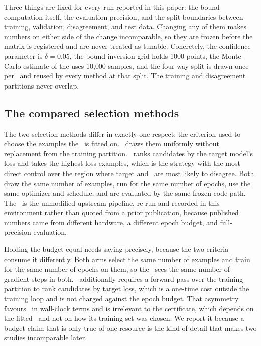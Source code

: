 Three things are fixed for every run reported in this paper: the bound
computation itself, the evaluation precision, and the split boundaries between
training, validation, disagreement, and test data. Changing any of them makes
numbers on either side of the change incomparable, so they are frozen before the
matrix is registered and are never treated as tunable. Concretely, the
confidence parameter is $\delta = 0.05$, the bound-inversion grid holds 1000
points, the Monte Carlo estimate of the \disagreement uses 10{,}000 samples,
and the four-way split is drawn once per \splitseed\ and reused by every method
at that split. The training and disagreement partitions never overlap.

\subsection{The compared selection methods}
\label{sec:methods}

The two selection methods differ in exactly one respect: the criterion used to
choose the examples the \surrogate\ is fitted on. \methodrandom\ draws them
uniformly without replacement from the training partition. \methodmax\ ranks
candidates by the target model's loss and takes the highest-loss examples, which
is the strategy with the most direct control over the region where target and
\surrogate\ are most likely to disagree. Both draw the same number of examples,
run for the same number of epochs, use the same optimizer and schedule, and are
evaluated by the same frozen code path. The \methodcontrol\ is the unmodified
upstream pipeline, re-run and recorded in this environment rather than quoted
from a prior publication, because published numbers came from different
hardware, a different epoch budget, and full-precision evaluation.

Holding the budget equal needs saying precisely, because the two criteria
consume it differently. Both arms select the same number of examples and train
for the same number of epochs on them, so the \surrogate\ sees the same number
of gradient steps in both. \methodmax\ additionally requires a forward pass over
the training partition to rank candidates by target loss, which is a one-time
cost outside the training loop and is not charged against the epoch budget. That
asymmetry favours \methodmax\ in wall-clock terms and is irrelevant to the
certificate, which depends on the fitted \surrogate\ and not on how its training
set was chosen. We report it because a budget claim that is only true of one
resource is the kind of detail that makes two studies incomparable later.

